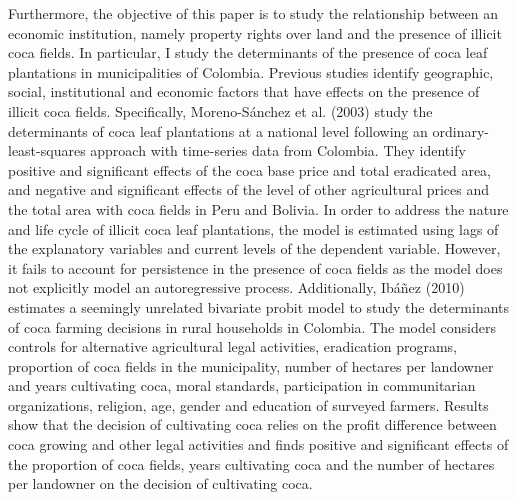 \documentclass[a4paper, 12pt]{article}
\begin{document}
Furthermore, the objective of this paper is to study the relationship between an economic institution, namely property rights over land and the presence of illicit coca fields. In particular, I study the determinants of the presence of coca leaf plantations in municipalities of Colombia. Previous studies identify geographic, social, institutional and economic factors that have effects on the presence of illicit coca fields. Specifically, Moreno-S\'{a}nchez et al. (2003) study the determinants of coca leaf plantations at a national level following an ordinary-least-squares approach with time-series data from Colombia. They identify positive and significant effects of the coca base price and total eradicated area, and negative and significant effects of the level of other agricultural prices and the total area with coca fields in Peru and Bolivia. In order to address the nature and life cycle of illicit coca leaf plantations, the model is estimated using lags of the explanatory variables and current levels of the dependent variable. However, it fails to account for persistence in the presence of coca fields as the model does not explicitly model an autoregressive process. Additionally, Ib\'{a}\~{n}ez (2010) estimates a seemingly unrelated bivariate probit model to study the determinants of coca farming decisions in rural households in Colombia. The model considers controls for alternative agricultural legal activities, eradication programs, proportion of coca fields in the municipality, number of hectares per landowner and years cultivating coca, moral standards, participation in communitarian organizations, religion, age, gender and education of surveyed farmers. Results show that the decision of cultivating coca relies on the profit difference between coca growing and other legal activities and finds positive and significant effects of the proportion of coca fields, years cultivating coca and the number of hectares per landowner on the decision of cultivating coca.
\end{document}
